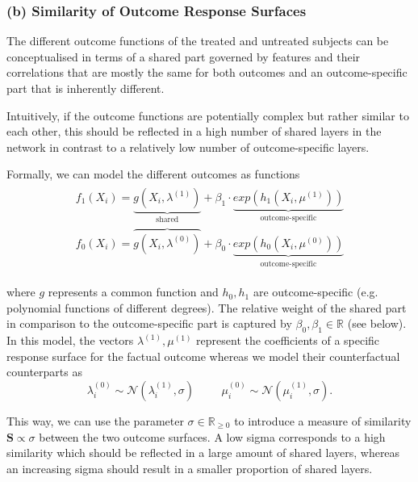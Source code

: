 \subsubsection{(b) Similarity of  Outcome Response Surfaces}
The different outcome functions of the treated and untreated subjects can be conceptualised in terms of a shared part governed by features and their correlations that are mostly the same for both outcomes and an outcome-specific part that is inherently different. 

Intuitively, if the outcome functions are potentially complex but rather similar to each other, this should be reflected in a high number of shared layers in the network in contrast to a relatively low number of outcome-specific layers. 

Formally, we can model the different outcomes as functions
\begin{align}
\label{eqn:outcome-functions}
\begin{split}
f_1(X_i) =  \underbrace{g(X_i, \lambda^{(1)})}_{\text{shared}} +   \beta_1 \cdot \underbrace{ exp(h_1(X_i, \mu^{(1)}))}_{\text{outcome-specific}}
\\
f_0(X_i) = \overbrace{g(X_i, \lambda^{(0)})} +  \beta_0 \cdot \underbrace{exp(h_0(X_i, \mu^{(0)}))}_{\text{outcome-specific}}
\end{split}
\end{align}


where $g$ represents a common function and $h_0, h_1$ are outcome-specific (e.g. polynomial functions of different degrees). The relative weight of the shared part in comparison to the outcome-specific part is captured by $\beta_0, \beta_1 \in \mathbb{R}$ (see below). In this model, the vectors $\lambda^{(1)}, \mu^{(1)}$ represent the coefficients of a specific response surface for the factual outcome whereas we model their counterfactual counterparts as
\begin{equation}
\label{eqn:mu_and_sigma}
\lambda^{(0)}_i \sim \mathcal{N}(\lambda^{(1)}_i, \sigma)  \hspace{1cm} \mu^{(0)}_i \sim \mathcal{N}(\mu^{(1)}_i, \sigma).
\end{equation}


This way, we can use the parameter $\sigma \in \mathbb{R}_{\geq0}$ to introduce a measure of similarity $\mathbf{S} \propto \sigma$ between the two outcome surfaces. A low sigma corresponds to a high similarity which should be reflected in a large amount of shared layers, whereas an increasing sigma should result in a smaller proportion of shared layers. 

